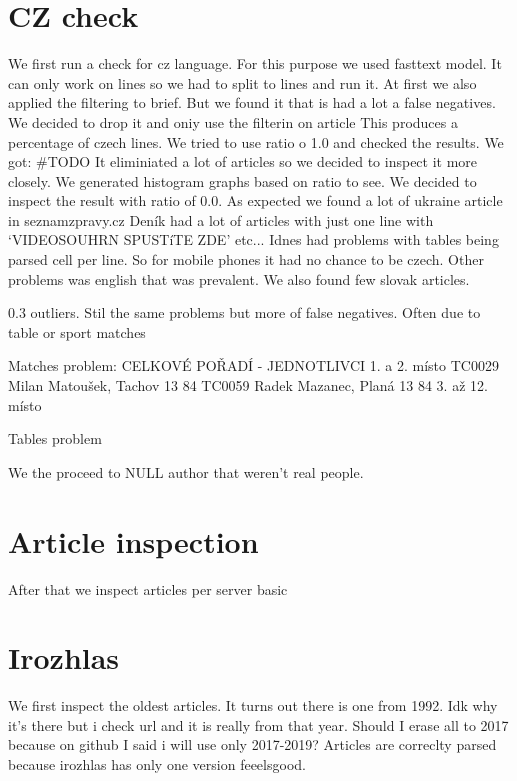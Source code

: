 \documentclass{article}
\begin{document}
    \section{CZ check}
    We first run a check for cz language. For this purpose we used fasttext model.
    It can only work on lines so we had to split to lines and run it.
    At first we also applied the filtering to brief. But we found it that is had a lot a false negatives.
    We decided to drop it and oniy use the filterin on article
    This produces a percentage of czech lines. We tried to use ratio o 1.0 and checked the results.
    We got: #TODO
    It eliminiated a lot of articles so we decided to inspect it more closely. We generated histogram graphs based on ratio to see.
    We decided to inspect the result with ratio of 0.0. As expected we found a lot of ukraine article in seznamzpravy.cz
    Deník had a lot of articles with just one line with `VIDEOSOUHRN SPUSTíTE ZDE' etc...
    Idnes had problems with tables being parsed cell per line. So for mobile phones it had no chance to be czech.
    Other problems was english that was prevalent. We also found few slovak articles.

    0.3 outliers.
    Stil the same problems but more of false negatives. Often due to table or sport matches

    Matches problem:
    CELKOVÉ POŘADÍ - JEDNOTLIVCI
        1. a 2. místo
        TC0029 Milan Matoušek, Tachov 13 84
        TC0059 Radek Mazanec, Planá 13 84
        3. až 12. místo

    Tables problem



    We the proceed to NULL author that weren't real people.

    \section{Article inspection}
    After that we inspect articles per server basic


    \section{Irozhlas}
    We first inspect the oldest articles.
    It turns out there is one from 1992. Idk why it's there but i check url and it is really from that year. Should I erase all to 2017 because on github I said i will use only 2017-2019? Articles are correclty parsed because
    irozhlas has only one version feeelsgood.
\end{document}
